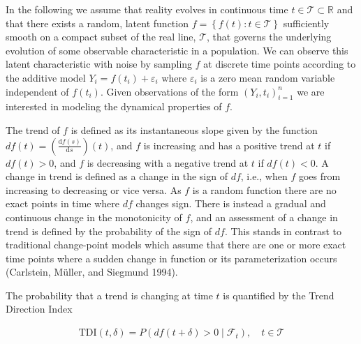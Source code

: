 \documentclass[11pt,]{article}
\theoremstyle{nonumberplain}
\begin{document}
In the following we assume that reality evolves in continuous time
\(t \in \mathcal{T} \subset \mathbb{R}\) and that there exists a random,
latent function \(f = \left\{f(t) : t \in \mathcal{T}\right\}\)
sufficiently smooth on a compact subset of the real line,
\(\mathcal{T}\), that governs the underlying evolution of some
observable characteristic in a population. We can observe this latent
characteristic with noise by sampling \(f\) at discrete time points
according to the additive model \(Y_i = f(t_i) + \varepsilon_i\) where
\(\varepsilon_i\) is a zero mean random variable independent of
\(f(t_i)\). Given observations of the form \((Y_i, t_i)_{i=1}^n\) we are
interested in modeling the dynamical properties of \(f\).

The trend of \(f\) is defined as its instantaneous slope given by the
function \(df(t) = \left(\frac{\mathrm{d}f(s)}{\mathrm{d}s}\right)(t)\),
and \(f\) is increasing and has a positive trend at \(t\) if
\(df(t) > 0\), and \(f\) is decreasing with a negative trend at \(t\) if
\(df(t) < 0\). A change in trend is defined as a change in the sign of
\(df\), i.e., when \(f\) goes from increasing to decreasing or vice
versa. As \(f\) is a random function there are no exact points in time
where \(df\) changes sign. There is instead a gradual and continuous
change in the monotonicity of \(f\), and an assessment of a change in
trend is defined by the probability of the sign of \(df\). This stands
in contrast to traditional change-point models which assume that there
are one or more exact time points where a sudden change in function or
its parameterization occurs (Carlstein, Müller, and Siegmund 1994).

The probability that a trend is changing at time \(t\) is quantified by
the Trend Direction Index

\begin{align}
  \mathrm{TDI}(t, \delta) = P(df(t + \delta ) > 0 \mid \mathcal{F}_t), \quad t \in \mathcal{T}\label{eq:TCIdef}
\end{align}
\end{document}
